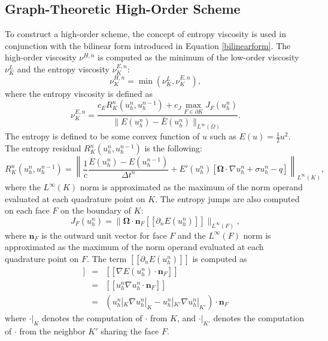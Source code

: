 \subsection{Graph-Theoretic High-Order Scheme}\label{gthighorder}
To construct a high-order scheme, the concept of entropy viscosity is used in
conjunction with the bilinear form introduced in Equation \eqref{bilinearform}.
The high-order viscosity $\nu^{H,n}$ is computed as the minimum of the low-order
viscosity $\nu^{L}_K$ and the entropy viscosity $\nu^{E,n}_K$:
\begin{equation}
   \nu^{H,n}_K = \min(\nu^{L}_K,\nu^{E,n}_K),
\end{equation}
where the entropy viscosity is defined as
\begin{equation}
   \nu^{E,n}_K = \frac{c_E R_K^n(u_h^n,u_h^{n-1})
      + c_J\max\limits_{F\in\partial K}J_F(u_h^n)}
      {\|E(u_h^n)-\bar{E}(u_h^n)\|_{L^\infty(\Omega)}}.
\end{equation}
The entropy is defined to be some convex function of $u$ such as
$E(u)=\frac{1}{2}u^2$. The entropy residual $R_K^n(u_h^n,u_h^{n-1})$ is the
following:
\begin{equation}
    R_K^n(u_h^n,u_h^{n-1}) = \left\|\frac{1}{c}\frac{E(u_h^n)-E(u_h^{n-1})}{\Delta t^n}
      + E'(u_h^n)\left[\mathbf{\Omega}\cdot\nabla u_h^n
      + \sigma u_h^n
      - q\right]\right\|_{L^\infty(K)},
\end{equation}
where the $L^\infty(K)$ norm is approximated as the maximum of the norm operand evaluated
at each quadrature point on $K$.
The entropy jumps are also computed on each face $F$ on the boundary of $K$:
\begin{equation}
   J_F(u_h^n) = \|\mathbf{\Omega}\cdot
      \mathbf{n}_F[\![\partial_n E(u_h^n)]\!]\|_{L^\infty(F)},
\end{equation}
where $\mathbf{n}_F$ is the outward unit vector for face $F$ and
the $L^\infty(F)$ norm is approximated as the maximum of the norm operand evaluated
at each quadrature point on $F$. The term $[\![\partial_n E(u_h^n)]\!]$ is computed as
\begin{eqnarray}
   [\![\partial_n E(u_h^n)]\!] & = & [\![\nabla E(u_h^n)\cdot\mathbf{n}_F]\!]\\
                        & = & [\![u_h^n\nabla u_h^n\cdot\mathbf{n}_F]\!]\\
                        & = & (u_h^n|_K\nabla u_h^n|_K - u_h^n|_{K'}
                           \nabla u_h^n|_{K'})\cdot\mathbf{n}_F
\end{eqnarray}
where $\cdot|_K$ denotes the computation of $\cdot$ from $K$, and $\cdot|_{K'}$
denotes the computation of $\cdot$ from the neighbor $K'$ sharing the face $F$.

